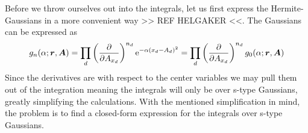     Before we throw ourselves out into the integrals, let us first express the
    Hermite-Gaussians in a more convenient way >> REF HELGAKER <<. The
    Gaussians can be expressed as
        \begin{equation}
            g_n(\alpha;\boldsymbol{{r}},\boldsymbol{{A}}) = \prod_d  \left(\frac{\mathrm{\partial}}{\mathrm{\partial} A_{x_d}}\right)^{n_d}
            \mathrm{e}^{-\alpha (x_d-A_d)^2} = \prod_d \left(\frac{\mathrm{\partial}}{\mathrm{\partial} A_{x_d}}\right)^{n_d}
            g_0(\alpha;\boldsymbol{{r}},\boldsymbol{{A}})
            \label{eq:centerDerGauss}
        \end{equation}
    Since the derivatives are with respect to the center variables we may pull
    them out of the integration meaning the integrals will only be over s-type
    Gaussians, greatly simplifying the calculations. With the mentioned
    simplification in mind, the problem is to find a closed-form expression for
    the integrals over s-type Gaussians.

